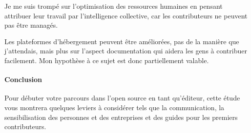	Je me suis trompé sur l'optimisation des ressources humaines en pensant attribuer leur travail par l'intelligence collective, car les contributeurs ne peuvent pas être managés.

	Les plateformes d'hébergement peuvent être améliorées, pas de la manière que j'attendais, mais plus sur l'aspect documentation qui aidera les gens à contribuer facilement. Mon hypothèse à ce sujet est donc partiellement valable.

	\paragraph*{Conclusion\\}

	Pour débuter votre parcours dans l'open source en tant qu'éditeur, cette étude vous montrera quelques leviers à considérer tels que la communication, la sensibilisation des personnes et des entreprises et des guides pour les premiers contributeurs.






